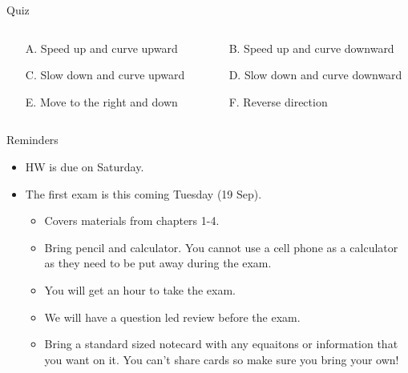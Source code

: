 \documentclass{beamer}
\begin{document}
\begin{frame}{Quiz}
\begin{enumerate}
\begin{columns}
\begin{column}{0.5\textwidth}
\begin{enumerate}
      \item[A.] Speed up and curve upward
      \item[C.] Slow down and curve upward
      \item[E.] Move to the right and down
   \end{enumerate}
   \end{column}
   \begin{column}{0.55\textwidth}
   \begin{enumerate}
      \item[B.] Speed up and curve downward
      \item[D.] Slow down and curve downward
      \item[F.] Reverse direction
   \end{enumerate}
   \end{column}
   \end{columns}
\end{enumerate}
\end{frame}

\begin{frame}{Reminders}
\begin{itemize}
   \item HW is due on Saturday.
   \item The first exam is this coming Tuesday (19 Sep).
   \begin{itemize}
      \item Covers materials from chapters 1-4.
      \item Bring pencil and calculator. You cannot use a cell phone as a calculator as they need to be put away during the exam.
      \item You will get an hour to take the exam.
      \item We will have a question led review before the exam.
      \item Bring a standard sized notecard with any equaitons or information that you want on it. You can't share cards so make sure you bring your own!
   \end{itemize}
\end{itemize}
\end{frame}
\end{document}
